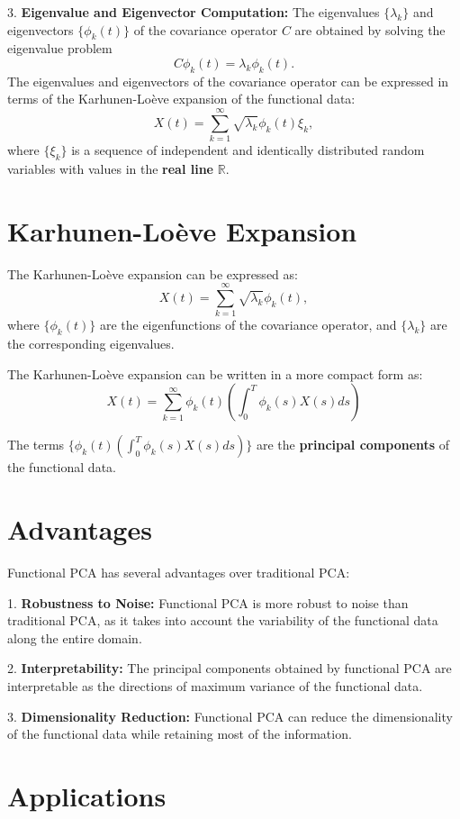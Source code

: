 \documentclass{article}
\begin{document}
3. \textbf{Eigenvalue and Eigenvector Computation:} The eigenvalues $\{\lambda_k\}$ and eigenvectors $\{\phi_k(t)\}$ of the covariance operator $C$ are obtained by solving the eigenvalue problem \[ C \phi_k(t) = \lambda_k \phi_k(t). \] The eigenvalues and eigenvectors of the covariance operator can be expressed in terms of the Karhunen-Loève expansion of the functional data: \[ X(t) = \sum_{k=1}^{\infty} \sqrt{\lambda_k} \phi_k(t) \xi_k, \] where $\{\xi_k\}$ is a sequence of independent and identically distributed random variables with values in the \textbf{real line} $\mathbb{R}$. 

\section{Karhunen-Loève Expansion}

The Karhunen-Loève expansion can be expressed as:
\[ X(t) = \sum_{k=1}^{\infty} \sqrt{\lambda_k} \phi_k(t), \]
where $\{\phi_k(t)\}$ are the eigenfunctions of the covariance operator, and $\{\lambda_k\}$ are the corresponding eigenvalues.

The Karhunen-Loève expansion can be written in a more compact form as:
\[ X(t) = \sum_{k=1}^{\infty} \phi_k(t) \left( \int_{0}^{T} \phi_k(s) X(s)ds \right) \]

The terms $\{\phi_k(t) \left( \int_{0}^{T} \phi_k(s) X(s)ds \right)\}$ are the \textbf{principal components} of the functional data.

\section{Advantages}

Functional PCA has several advantages over traditional PCA:

1. \textbf{Robustness to Noise:} Functional PCA is more robust to noise than traditional PCA, as it takes into account the variability of the functional data along the entire domain.

2. \textbf{Interpretability:} The principal components obtained by functional PCA are interpretable as the directions of maximum variance of the functional data.

3. \textbf{Dimensionality Reduction:} Functional PCA can reduce the dimensionality of the functional data while retaining most of the information.

\section{Applications}
\end{document}
